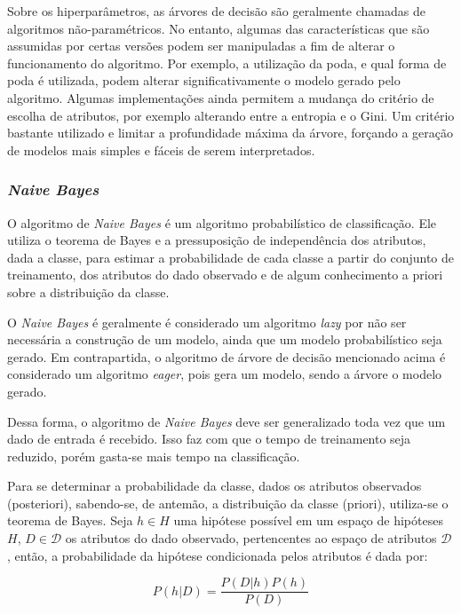 \documentclass{article}
\begin{document}
Sobre os hiperparâmetros, as árvores de decisão são geralmente chamadas de algoritmos não-paramétricos.
No entanto, algumas das características que são assumidas por certas versões podem ser manipuladas
a fim de alterar o funcionamento do algoritmo.
Por exemplo, a utilização da poda, e qual forma de poda é utilizada,
podem alterar significativamente o modelo gerado pelo algoritmo.
Algumas implementações ainda permitem a mudança do critério de escolha de atributos,
por exemplo alterando entre a entropia e o Gini.
Um critério bastante utilizado e limitar a profundidade máxima da árvore,
forçando a geração de modelos mais simples e fáceis de serem interpretados.


\subsubsection{{\b \it Naive Bayes}}

O algoritmo de {\it Naive Bayes} é um algoritmo probabilístico de classificação.
Ele utiliza o teorema de Bayes e a pressuposição de independência dos atributos, dada a classe,
para estimar a probabilidade de cada classe a partir do conjunto de treinamento,
dos atributos do dado observado e de algum conhecimento a priori sobre a distribuição da classe.

O {\it Naive Bayes} é geralmente é considerado um algoritmo {\it lazy} por não ser necessária a construção de um modelo,
ainda que um modelo probabilístico seja gerado.
Em contrapartida, o algoritmo de árvore de decisão mencionado acima é considerado um algoritmo {\it eager}, pois gera um modelo, sendo a árvore o modelo gerado.

Dessa forma, o algoritmo de {\it Naive Bayes} deve ser generalizado toda vez que um dado de entrada é recebido.
Isso faz com que o tempo de treinamento seja reduzido, porém gasta-se mais tempo na classificação.

Para se determinar a probabilidade da classe, dados os atributos observados (posteriori),
sabendo-se, de antemão, a distribuição da classe (priori), utiliza-se o teorema de Bayes.
Seja $h \in H$ uma hipótese possível em um espaço de hipóteses $H$,
$D \in \mathcal{D}$ os atributos do dado observado, pertencentes ao espaço de atributos $\mathcal{D}$,
então, a probabilidade da hipótese condicionada pelos atributos é dada por:

\begin{equation}
P(h|D) = \frac{P(D|h) P(h)}{P(D)}
\end{equation}
\end{document}
